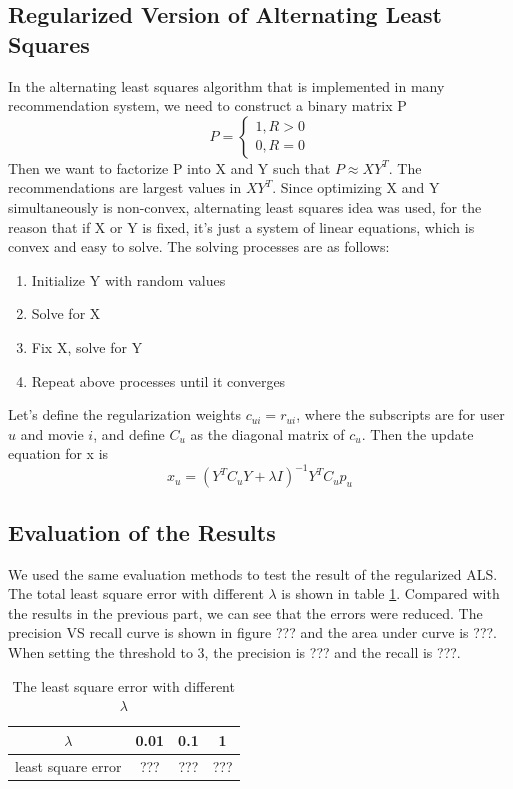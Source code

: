\documentclass{article}
\begin{document}
\subsection{Regularized Version of Alternating Least Squares}
In the alternating least squares algorithm that is implemented in many recommendation system, we need to construct a binary matrix P
\begin{equation*}
P = \begin{cases}
				1, R > 0\\
				0, R = 0
		\end{cases}
\end{equation*}
Then we want to factorize P into X and Y such that $P \approx XY^T$. The recommendations are largest values in $XY^T$. Since optimizing X and Y simultaneously is non-convex, alternating least squares idea was used, for the reason that if X or Y is fixed, it's just a system of linear equations, which is convex and easy to solve. The solving processes are as follows:
\begin{enumerate}
\item Initialize Y with random values
\item Solve for X
\item Fix X, solve for Y
\item Repeat above processes until it converges
\end{enumerate}
Let's define the regularization weights $c_{ui} = r_{ui}$, where the subscripts are for user $u$ and movie $i$, and define $C_u$ as the diagonal matrix of $c_u$. Then the update equation for x is
\begin{equation*}
x_u = (Y^TC_uY+\lambda I)^{-1}Y^TC_up_u
\end{equation*}
\subsection{Evaluation of the Results}
We used the same evaluation methods to test the result of the regularized ALS. The total least square error with different $\lambda$ is shown in table \ref{tb:lamda}. Compared with the results in the previous part, we can see that the errors were reduced. The precision VS recall curve is shown in figure ??? and the area under curve is ???. When setting the threshold to 3, the precision is ??? and the recall is ???.
\begin{table}
\begin{center}
\caption{The least square error with different $\lambda$}
\label{tb:lamda}
\begin{tabular}{|c|c|c|c|}
\hline
$\lambda$& 0.01& 0.1 & 1\\
\hline
least square error&???&???&???\\
\hline
\end{tabular}
\end{center}
\end{table}
\end{document}
